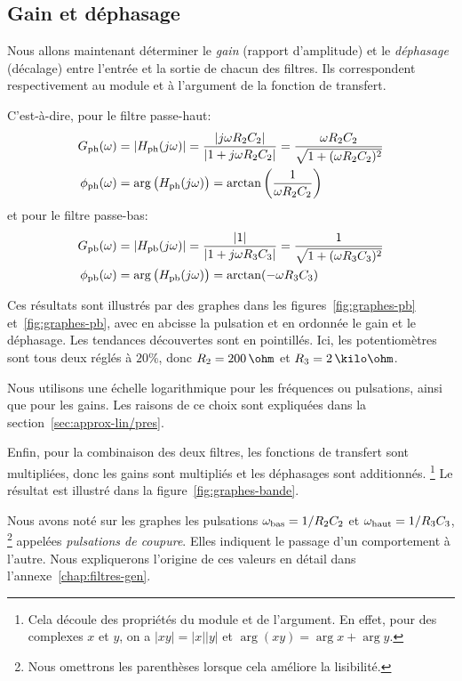 \subsection{Gain et déphasage}

Nous allons maintenant déterminer
le \emph{gain} (rapport d'amplitude) et le  \emph{déphasage} (décalage)
entre l'entrée et la sortie de chacun des filtres.
Ils correspondent respectivement au module et à l'argument de la fonction de
transfert.

C'est-à-dire, pour le filtre passe-haut:
\begin{align}
    G_{\mathrm{ph}}(\omega) &= |H_{\mathrm{ph}}(j\omega)|
    = \frac{|j\omega R_2C_2|}{|1 + j\omega R_2C_2|}
    = \frac{\omega R_2C_2}{\sqrt{1+(\omega R_2C_2)^2}}\\
    \phi_{\mathrm{ph}}(\omega) &= \arg\big(H_{\mathrm{ph}}(j\omega)\big)
    = \arctan\left(\frac{1}{\omega R_2C_2}\right)
\end{align}
et pour le filtre passe-bas:
\begin{align}
    G_{\mathrm{pb}}(\omega) &= |H_{\mathrm{pb}}(j\omega)|
    = \frac{|1|}{|1 + j\omega R_3C_3|}
    = \frac{1}{\sqrt{1+(\omega R_3C_3)^2}}\\
    \phi_{\mathrm{pb}}(\omega) &= \arg\big(H_{\mathrm{pb}}(j\omega)\big)
    = \arctan(-\omega R_3C_3)
\end{align}

Ces résultats sont illustrés par des graphes dans
les figures~\ref{fig:graphes-pb} et~\ref{fig:graphes-pb},
avec en abcisse la pulsation
et en ordonnée le gain et le déphasage.
Les tendances découvertes sont en pointillés.
Ici, les potentiomètres sont tous deux réglés à $20\%$,
donc $R_2 = 200\,\ohm$ et $R_3 = 2\,\kilo\ohm$.

Nous utilisons une échelle logarithmique pour les fréquences
ou pulsations, ainsi que pour les gains.
Les raisons de ce choix sont expliquées dans
la section~\ref{sec:approx-lin/pres}.

Enfin, pour la combinaison des deux filtres,
les fonctions de transfert sont multipliées,
donc les gains sont multipliés et les déphasages sont additionnés.%
\footnote{
    Cela découle des propriétés du module et de l'argument.
    En effet, pour des complexes $x$ et $y$,
    on a $|xy| = |x||y|$ et $\arg(xy) = \arg x + \arg y$.
}
Le résultat est illustré dans la figure~\ref{fig:graphes-bande}.

Nous avons noté sur les graphes les pulsations
$\omega_{\mathrm{bas}} = 1/R_2C_2$ et $\omega_{\mathrm{haut}}=1/R_3C_3$,%
\footnote{Nous omettrons les parenthèses lorsque cela améliore la lisibilité.}
appelées \emph{pulsations de coupure}.
Elles indiquent le passage d'un comportement à l'autre.
Nous expliquerons l'origine de ces valeurs en détail dans
l'annexe~\ref{chap:filtres-gen}.
